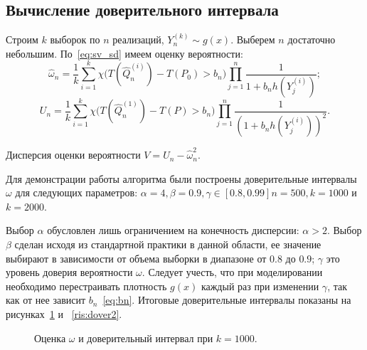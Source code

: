 \documentclass[12pt, specialist, subf, substylefile = spbu.rtx]{disser}
\begin{document}

\subsection{Вычисление доверительного интервала}

Строим $k$ выборок по $n$ реализаций, $Y^{(k)}_n \sim g(x).$ Выберем $n$ достаточно небольшим. По~\eqref{eq:sv_sd} имеем оценку вероятности:
$$
\hat{\omega}_n=\frac{1}{k} \sum\limits_{i=1}^{k}
\chi \big(T(\hat{Q}^{(i)}_n)-T(P_0) > b_n\big)
\prod\limits_{j=1}^{n} \frac{1}{1+b_nh(Y_j^{(i)})};
$$
$$
U_n=\frac{1}{k} \sum\limits_{i=1}^{k}
\chi \big(T(\hat{Q}^{(1)}_n)-T(P) > b_n\big)
\prod\limits_{j=1}^{n} \frac{1}{(1+b_nh(Y_j^{(i)}))^2}.
$$

Дисперсия оценки вероятности $V=U_n-\hat\omega_n^2$.

Для демонстрации работы алгоритма были построены доверительные интервалы $\omega$ для следующих параметров: $\alpha=4, \beta=0.9, \gamma \in [0.8, 0.99] n=500, k=1000$ и $k=2000$. 

Выбор $\alpha$ обусловлен лишь ограничением на конечность дисперсии: $\alpha > 2.$ Выбор $\beta$ сделан исходя из стандартной практики в данной области, ее значение выбирают в зависимости от объема выборки в диапазоне от $0.8$ до $0.9$; $\gamma$ это уровень доверия вероятности $\omega$. Следует учесть, что при моделировании необходимо перестраивать плотность $g(x)$ каждый раз при изменении $\gamma$, так как от нее зависит $b_n$~\eqref{eq:bn}. Итоговые доверительные интервалы показаны на рисунках~\ref{ris:dover1} и ~\ref{ris:dover2}.

\begin{figure}[h]
\caption{Оценка $\omega$ и доверительный интервал при $k=1000$.}
\label{ris:dover1}
\end{figure}
\end{document}

